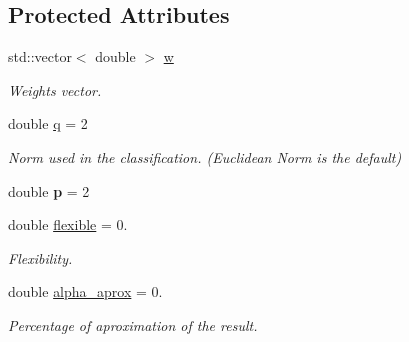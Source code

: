 \subsection*{Protected Attributes}
\begin{DoxyCompactItemize}
\item 
\mbox{\label{class_primal_classifier_a6191919f25a037b6a61d00ebda18f41e}} 
std\+::vector$<$ double $>$ \mbox{\hyperlink{class_primal_classifier_a6191919f25a037b6a61d00ebda18f41e}{w}}
\begin{DoxyCompactList}\small\item\em Weights vector. \end{DoxyCompactList}\item 
\mbox{\label{class_primal_classifier_ae30c00c25bce4b1623baa54b5e2812b4}} 
double \mbox{\hyperlink{class_primal_classifier_ae30c00c25bce4b1623baa54b5e2812b4}{q}} = 2
\begin{DoxyCompactList}\small\item\em Norm used in the classification. (Euclidean Norm is the default) \end{DoxyCompactList}\item 
\mbox{\label{class_primal_classifier_ac5b59dafe749376fb067ceda690f405d}} 
double {\bfseries p} = 2
\item 
\mbox{\label{class_primal_classifier_a5d41554dc1158ede39d387fecf73c96e}} 
double \mbox{\hyperlink{class_primal_classifier_a5d41554dc1158ede39d387fecf73c96e}{flexible}} = 0.
\begin{DoxyCompactList}\small\item\em Flexibility. \end{DoxyCompactList}\item 
\mbox{\label{class_primal_classifier_a2668546ac4a39e10f72cbd2e865c41a7}} 
double \mbox{\hyperlink{class_primal_classifier_a2668546ac4a39e10f72cbd2e865c41a7}{alpha\+\_\+aprox}} = 0.
\begin{DoxyCompactList}\small\item\em Percentage of aproximation of the result. \end{DoxyCompactList}\end{DoxyCompactItemize}


